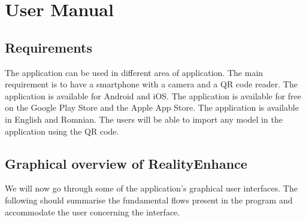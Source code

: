 \chapter{User Manual}\label{cap:evaluation}

\section{Requirements}
The application can be used in different area of application. The main requirement is to have a smartphone with a camera and a QR code reader. The application is available for Android and iOS. The application is available for free on the Google Play Store and the Apple App Store. The application is available in English and Romnian. The users will be able to import any model in the application using the QR code.

\section{Graphical overview of RealityEnhance}
We will now go through some of the application's graphical user interfaces. The following should summarise the fundamental flows present in the program and accommodate the user concerning the interface.
\pagebreak

